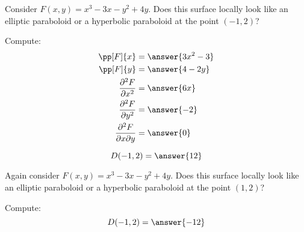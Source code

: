 \documentclass{ximera}
\begin{document}
\begin{question}
  Consider $F(x,y) = x^3-3x-y^2+4y$. Does this surface locally look like
  an elliptic paraboloid or a hyperbolic paraboloid at the point
  $(-1,2)$?
  \begin{prompt}
    Compute:
    \begin{align*}
      \pp[F]{x} &= \answer{3x^2-3}\\
      \pp[F]{y} &= \answer{4-2y}\\
      \frac{\partial^2F}{\partial x^2} &= \answer{6x}\\
      \frac{\partial^2F}{\partial y^2} &= \answer{-2}\\
      \frac{\partial^2F}{\partial x\partial y} &= \answer{0}\\
    \end{align*}
    \begin{question}
      \[
      D(-1,2) = \answer{12}
      \]
      \begin{question}
        \begin{multipleChoice}
        \end{multipleChoice}
      \end{question}
    \end{question}
  \end{prompt}
  \begin{question}
  Again consider $F(x,y) = x^3-3x-y^2+4y$. Does this surface locally look like
  an elliptic paraboloid or a hyperbolic paraboloid at the point
  $(1,2)$?
  \begin{prompt}
    Compute:
    \[
    D(-1,2) = \answer{-12}
    \]
    \begin{question}
      \begin{multipleChoice}
      \end{multipleChoice}
    \end{question}
  \end{prompt}
  \end{question}
\end{question}
\end{document}
